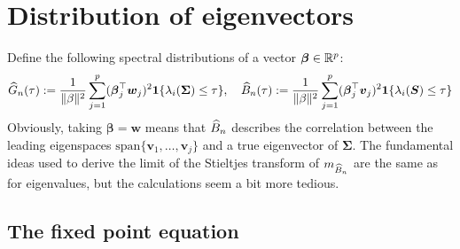 \documentclass{article}
\newcommand{\bv}{\boldsymbol{v}}
\newcommand{\bw}{\boldsymbol{w}}
\newcommand{\bbeta}{\boldsymbol{\beta}}
\newcommand{\bSigma}{\boldsymbol{\Sigma}}
\newcommand{\bS}{\boldsymbol{S}}
\begin{document}
\section{Distribution of eigenvectors}
Define the following spectral distributions of a vector $\bbeta \in \Reals^p$:
$$
\wh{G}_n(\tau) := \frac{1}{\|\beta\|^2} \sum_{j = 1}^{p} (\bbeta_j^{\top} \bw_j)^2 \1\{\lambda_i(\bSigma) \leq \tau\}, \quad \wh{B}_n(\tau) := \frac{1}{\|\beta\|^2} \sum_{j = 1}^{p} (\bbeta_j^{\top} \bv_j)^2 \1\{\lambda_i(\bS) \leq \tau\}
$$ 
Obviously, taking $\bbeta = \bw$ means that $\widehat{B}_n$ describes the correlation between the leading eigenspaces $\mathrm{span}\{\bv_1,\ldots,\bv_j\}$ and a true eigenvector of $\bSigma$.  The fundamental ideas used to derive the limit of the Stieltjes transform of $m_{\widehat{B}_n}$ are the same as for eigenvalues, but the calculations seem a bit more tedious. 

\subsection{The fixed point equation}
\end{document}
